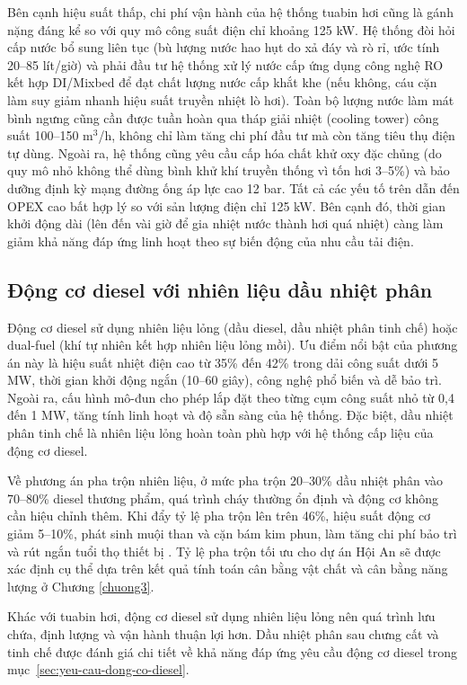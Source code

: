 \documentclass[../main.tex]{subfiles}
\begin{document}
Bên cạnh hiệu suất thấp, chi phí vận hành của hệ thống tuabin hơi cũng là gánh nặng đáng kể so với quy mô công suất điện chỉ khoảng 125 kW. Hệ thống đòi hỏi cấp nước bổ sung liên tục (bù lượng nước hao hụt do xả đáy và rò rỉ, ước tính 20--85 lít/giờ) và phải đầu tư hệ thống xử lý nước cấp ứng dụng công nghệ RO kết hợp DI/Mixbed để đạt chất lượng nước cấp khắt khe (nếu không, cáu cặn làm suy giảm nhanh hiệu suất truyền nhiệt lò hơi). Toàn bộ lượng nước làm mát bình ngưng cũng cần được tuần hoàn qua tháp giải nhiệt (cooling tower) công suất 100--150 m$^3$/h, không chỉ làm tăng chi phí đầu tư mà còn tăng tiêu thụ điện tự dùng. Ngoài ra, hệ thống cũng yêu cầu cấp hóa chất khử oxy đặc chủng (do quy mô nhỏ không thể dùng bình khử khí truyền thống vì tốn hơi 3--5\%) và bảo dưỡng định kỳ mạng đường ống áp lực cao 12 bar. Tất cả các yếu tố trên dẫn đến OPEX cao bất hợp lý so với sản lượng điện chỉ 125 kW. Bên cạnh đó, thời gian khởi động dài (lên đến vài giờ để gia nhiệt nước thành hơi quá nhiệt) càng làm giảm khả năng đáp ứng linh hoạt theo sự biến động của nhu cầu tải điện.

\subsection{Động cơ diesel với nhiên liệu dầu nhiệt phân}
\label{sec:dong-co-diesel}

Động cơ diesel sử dụng nhiên liệu lỏng (dầu diesel, dầu nhiệt phân tinh chế) hoặc dual-fuel (khí tự nhiên kết hợp nhiên liệu lỏng mồi). Ưu điểm nổi bật của phương án này là hiệu suất nhiệt điện cao từ 35\% đến 42\% trong dải công suất dưới 5 MW, thời gian khởi động ngắn (10--60 giây), công nghệ phổ biến và dễ bảo trì. Ngoài ra, cấu hình mô-đun cho phép lắp đặt theo từng cụm công suất nhỏ từ 0,4 đến 1 MW, tăng tính linh hoạt và độ sẵn sàng của hệ thống. Đặc biệt, dầu nhiệt phân tinh chế là nhiên liệu lỏng hoàn toàn phù hợp với hệ thống cấp liệu của động cơ diesel.

Về phương án pha trộn nhiên liệu, ở mức pha trộn 20--30\% dầu nhiệt phân vào 70--80\% diesel thương phẩm, quá trình cháy thường ổn định và động cơ không cần hiệu chỉnh thêm. Khi đẩy tỷ lệ pha trộn lên trên 46\%, hiệu suất động cơ giảm 5--10\%, phát sinh muội than và cặn bám kim phun, làm tăng chi phí bảo trì và rút ngắn tuổi thọ thiết bị \cite{QUATEST2024}. Tỷ lệ pha trộn tối ưu cho dự án Hội An sẽ được xác định cụ thể dựa trên kết quả tính toán cân bằng vật chất và cân bằng năng lượng ở Chương \ref{chuong3}.

Khác với tuabin hơi, động cơ diesel sử dụng nhiên liệu lỏng nên quá trình lưu chứa, định lượng và vận hành thuận lợi hơn. Dầu nhiệt phân sau chưng cất và tinh chế được đánh giá chi tiết về khả năng đáp ứng yêu cầu động cơ diesel trong mục~\ref{sec:yeu-cau-dong-co-diesel}.
\end{document}

